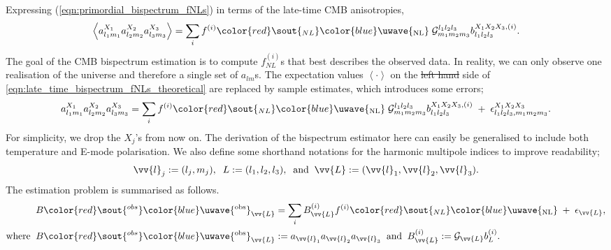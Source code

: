 \documentclass[a4paper,12pt,times,custombib,print,index]{Classes/PhDThesisPSnPDF} %
\providecommand{\DIFadd}[1]{{\protect\color{blue}\uwave{#1}}} %
\providecommand{\DIFdel}[1]{{\protect\color{red}\sout{#1}}}                      %
\providecommand{\DIFaddbegin}{} %
\providecommand{\DIFaddend}{} %
\providecommand{\DIFdelbegin}{} %
\providecommand{\DIFdelend}{} %
\newcommand{\DIFscaledelfig}{0.5}
\newlength{\DIFdelgraphicswidth} %
\newlength{\DIFdelgraphicsheight} %
\newcommand{\DIFaddincludegraphics}[2][]{{\color{blue}\fbox{\DIFOincludegraphics[#1]{#2}}}} %
\newcommand{\DIFdelincludegraphics}[2][]{%
\sbox{\DIFdelgraphicsbox}{\DIFOincludegraphics[#1]{#2}}%
\settoboxwidth{\DIFdelgraphicswidth}{\DIFdelgraphicsbox} %
\settoboxtotalheight{\DIFdelgraphicsheight}{\DIFdelgraphicsbox} %
\scalebox{\DIFscaledelfig}{%
\parbox[b]{\DIFdelgraphicswidth}{\usebox{\DIFdelgraphicsbox}\\[-\baselineskip] \rule{\DIFdelgraphicswidth}{0em}}\llap{\resizebox{\DIFdelgraphicswidth}{\DIFdelgraphicsheight}{%
\setlength{\unitlength}{\DIFdelgraphicswidth}%
\begin{picture}(1,1)%
\thicklines\linethickness{2pt} %
{\color[rgb]{1,0,0}\put(0,0){\framebox(1,1){}}}%
{\color[rgb]{1,0,0}\put(0,0){\line( 1,1){1}}}%
{\color[rgb]{1,0,0}\put(0,1){\line(1,-1){1}}}%
\end{picture}%
}\hspace*{3pt}}} %
} %
\DeclareRobustCommand{\DIFaddbegin}{\DIFOaddbegin \let\includegraphics\DIFaddincludegraphics} %
\DeclareRobustCommand{\DIFaddend}{\DIFOaddend \let\includegraphics\DIFOincludegraphics} %
\DeclareRobustCommand{\DIFdelbegin}{\DIFOdelbegin \let\includegraphics\DIFdelincludegraphics} %
\DeclareRobustCommand{\DIFdelend}{\DIFOaddend \let\includegraphics\DIFOincludegraphics} %
\begin{document}
Expressing (\ref{eqn:primordial_bispectrum_fNLs}) in terms of the late-time CMB anisotropies,
\begin{align}
	\left< a_{l_1 m_1}^{X_1} a_{l_2 m_2}^{X_2} a_{l_3 m_3}^{X_3}  \right> = \sum_i f^{(i)}\DIFdelbegin \DIFdel{_{NL} }\DIFdelend \DIFaddbegin \DIFadd{_\text{NL} }\DIFaddend \; \mathcal{G}^{l_1 l_2 l_3}_{m_1 m_2 m_3} b^{X_1 X_2 X_3, (i)}_{l_1 l_2 l_3}. \label{eqn:late_time_bispectrum_fNLs_theoretical}
\end{align}
The goal of the CMB bispectrum estimation is to compute \DIFdelbegin \DIFdel{$f^{(i)}_{NL}$}\DIFdelend \DIFaddbegin \DIFadd{$f^{(i)}_\text{NL}$}\DIFaddend s that best describes the observed data. In reality, we can only observe one realisation of the universe and therefore a single set of $a_{lm}$s. The expectation values $\left< \cdot \right>$ on the \DIFdelbegin \DIFdel{left hand }\DIFdelend \DIFaddbegin \DIFadd{left-hand }\DIFaddend side of \eqref{eqn:late_time_bispectrum_fNLs_theoretical} are replaced by sample estimates, which introduces some errors;
\begin{align}
	a_{l_1 m_1}^{X_1} a_{l_2 m_2}^{X_2} a_{l_3 m_3}^{X_3} = \sum_i  f^{(i)}\DIFdelbegin \DIFdel{_{NL} }\DIFdelend \DIFaddbegin \DIFadd{_\text{NL} }\DIFaddend \; \mathcal{G}^{l_1 l_2 l_3}_{m_1 m_2 m_3} b^{X_1 X_2 X_3, (i)}_{l_1 l_2 l_3} \;+\; \epsilon^{X_1 X_2 X_3}_{l_1 l_2 l_3, m_1 m_2 m_3}. \label{eqn:late_time_bispectrum_fNLs_sample}
\end{align}
For simplicity, we drop the $X_j$'s from now on. The derivation of the bispectrum estimator here can easily be generalised to include both temperature and E-mode polarisation. We also define some shorthand notations for the harmonic multipole indices to improve readability;
\begin{align}
	\vv{l}_j:=(l_j,m_j), \;\; L:=(l_1,l_2,l_3), \;\; \text{and} \;\; \vv{L}:=(\vv{l}_1, \vv{l}_2, \vv{l}_3).
\end{align}
The estimation problem is summarised as follows.
\begin{align}
	&B\DIFdelbegin \DIFdel{^{obs}}\DIFdelend \DIFaddbegin \DIFadd{^\text{obs}}\DIFaddend _\vv{L} = \sum_i B^{(i)}_\vv{L} f^{(i)}\DIFdelbegin \DIFdel{_{NL}  }\DIFdelend \DIFaddbegin \DIFadd{_\text{NL}  }\DIFaddend \;+\; \epsilon_\vv{L}, \label{eqn:bispectrum_estimation_core}\\
	\text{where} \;\; &B\DIFdelbegin \DIFdel{^{obs}}\DIFdelend \DIFaddbegin \DIFadd{^\text{obs}}\DIFaddend _\vv{L} := a_{\vv{l}_1} a_{\vv{l}_2} a_{\vv{l}_3} \;\; \text{and} \;\; B^{(i)}_\vv{L} := \mathcal{G}_\vv{L} b^{(i)}_L.
\end{align}
\end{document}
